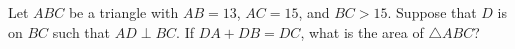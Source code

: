 Let $ABC$ be a triangle with $AB=13$, $AC=15$, and $BC>15$. Suppose that $D$ is on $BC$ such that $AD\perp BC$. If $DA+DB=DC$, what is the area of $\triangle{ABC}$?